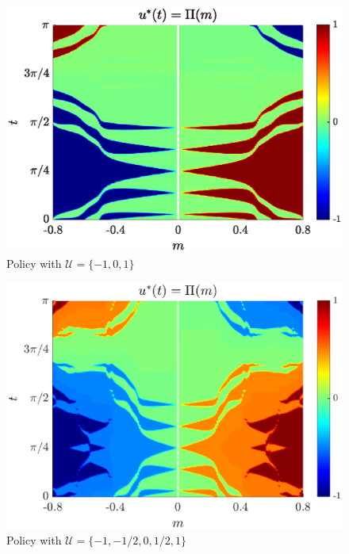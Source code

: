 \documentclass[twocolumn]{autart}    %
\begin{document}
\begin{figure}[ht!]
    \hspace{0.05em}
    \includegraphics[scale=0.525]{img/fig06.eps}
    \caption{Policy with $\mathcal{U}=\{-1,0,1\}$}\label{fig:sim-bang-off-bang}
\end{figure} 

\begin{figure}[ht!]
    \hspace{0.05em}
    \includegraphics[scale=0.525]{img/fig08.eps}
    \caption{Policy with $\mathcal{U}=\{-1,-1/2,0,1/2,1\}$}
    \label{fig:sim-multi-level}
\end{figure} 
\end{document}
